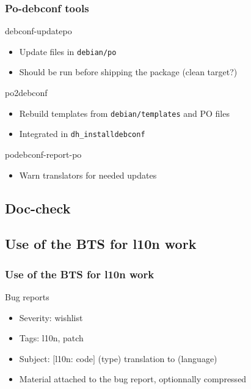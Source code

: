 \documentclass{beamer}
\begin{document}
\begin{frame}
  \frametitle{Po-debconf tools}
	\begin{block}
		{debconf-updatepo}
		\begin{itemize}
		\item
			{Update files in \texttt{debian/po}}
		\item
			Should be run before shipping the package (clean target?)
		\end{itemize}
	\end{block}
	\begin{block}
		{po2debconf}
		\begin{itemize}
		\item
			Rebuild templates from \texttt{debian/templates} and PO files
		\item
			Integrated in \texttt{dh\_installdebconf}
		\end{itemize}
	\end{block}
	\begin{block}
		{podebconf-report-po}
		\begin{itemize}
		\item
			Warn translators for needed updates
		\end{itemize}
	\end{block}
\end{frame}


\subsection{Doc-check}

\begin{frame}
  \frametitle{}
\end{frame}

\begin{frame}
  \frametitle{}
\end{frame}

\begin{frame}
  \frametitle{}
\end{frame}

\subsection{Use of the BTS for l10n work}

\begin{frame}
  \frametitle{Use of the BTS for l10n work}
	\begin{block}
		{Bug reports}
		\begin{itemize}
		\item
			Severity: wishlist
		\item
			Tags: l10n, patch
		\item
			Subject: $[$l10n: code$]$ (type) translation to (language)
		\item
			Material attached to the bug report, optionnally compressed
		\end{itemize}
	\end{block}
\end{frame}
\end{document}
